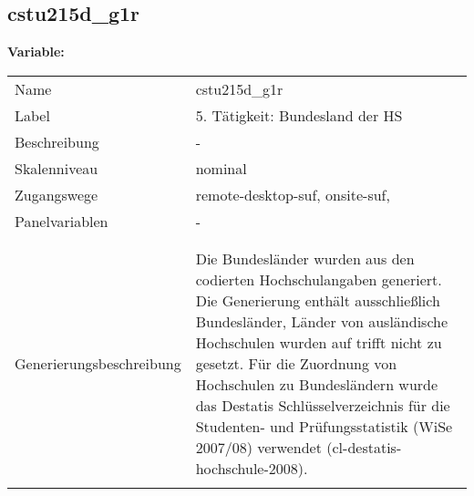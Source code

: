 	
	
	\subsection{cstu215d\_g1r}
	\label{subSection:cstu215d_g1r}

	\noindent\textbf{Variable:}\\
		\begin{tabular}{lL{11.3cm}}
			\label{tableVariable:cstu215d_g1r}
			Name & cstu215d\_g1r \\
			Label & 5. Tätigkeit: Bundesland der HS \\
			Beschreibung & - \\
			Skalenniveau & nominal \\
			Zugangswege &
				remote-desktop-suf,
				onsite-suf,
 \\
			Panelvariablen & -
			 \\
			 \\
 \\
					Generierungsbeschreibung & Die Bundesländer wurden aus den codierten Hochschulangaben generiert. Die Generierung enthält ausschließlich Bundesländer, Länder von ausländische Hochschulen wurden auf trifft nicht zu gesetzt. Für die Zuordnung von Hochschulen zu Bundesländern wurde das Destatis Schlüsselverzeichnis für die Studenten- und Prüfungsstatistik (WiSe 2007/08) verwendet (cl-destatis-hochschule-2008).
				 \\	
			 \\
		\end{tabular}






